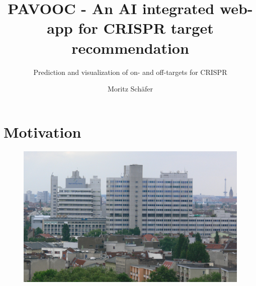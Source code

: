 \documentclass[Nike]{tuberlinbeamer}
\title{PAVOOC - An AI integrated web-app for CRISPR target recommendation}
\subtitle{Prediction and visualization of on- and off-targets for CRISPR}
\author[Moritz Schäfer]{Moritz Schäfer}
\institute{Technische Universität Berlin \& Bayer Pharma}
\begin{document}
\begin{frame}
\maketitle
\end{frame}

\section{Motivation}

\begin{frame}
  \begin{figure}
    \includegraphics[width=0.9\linewidth]{bayerbuilding.jpg}
  \end{figure}
\end{frame}

\end{document}
